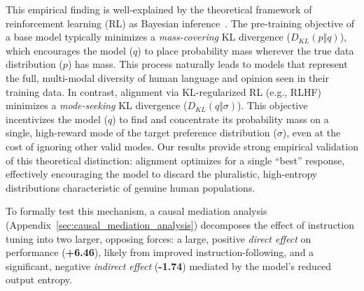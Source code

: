 \documentclass{article} %
\begin{document}
This empirical finding is well-explained by the theoretical framework of reinforcement learning (RL) as Bayesian inference~\citep{levine2018reinforcement, korbak-etal-2022-rl}. The pre-training objective of a base model typically minimizes a \textit{mass-covering} KL divergence ($D_{KL}(p \Vert q)$), which encourages the model ($q$) to place probability mass wherever the true data distribution ($p$) has mass. This process naturally leads to models that represent the full, multi-modal diversity of human language and opinion seen in their training data. In contrast, alignment via KL-regularized RL (e.g., RLHF) minimizes a \textit{mode-seeking} KL divergence ($D_{KL}(q \Vert \sigma)$). This objective incentivizes the model ($q$) to find and concentrate its probability mass on a single, high-reward mode of the target preference distribution ($\sigma$), even at the cost of ignoring other valid modes. Our results provide strong empirical validation of this theoretical distinction: alignment optimizes for a single ``best'' response, effectively encouraging the model to discard the pluralistic, high-entropy distributions characteristic of genuine human populations. 

To formally test this mechanism, a causal mediation analysis (Appendix~\ref{sec:causal_mediation_analysis}) decomposes the effect of instruction tuning into two larger, opposing forces: a large, positive \textit{direct effect} on performance (\textbf{+6.46}), likely from improved instruction-following, and a significant, negative \textit{indirect effect} (\textbf{-1.74}) mediated by the model's reduced output entropy.
\end{document}
